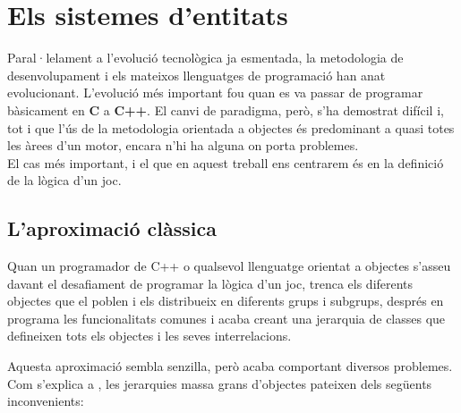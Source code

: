 \section{Els sistemes d'entitats}

Paral·lelament a l'evolució tecnològica ja esmentada, la metodologia de desenvolupament i els mateixos llenguatges de programació han anat evolucionant. L'evolució més important fou quan es va passar de programar bàsicament en {\bf C} a {\bf C++}. El canvi de paradigma, però, s'ha demostrat difícil i, tot i que l'ús de la metodologia orientada a objectes és predominant a quasi totes les àrees d'un motor, encara n'hi ha alguna on porta problemes.
\\

El cas més important, i el que en aquest treball ens centrarem és en la definició de la lògica d'un joc.

\subsection{L'aproximació clàssica}

Quan un programador de {C++} o qualsevol llenguatge orientat a objectes s'asseu davant el desafiament de programar la lògica d'un joc, trenca els diferents objectes que el poblen i els distribueix en diferents grups i subgrups, després en programa les funcionalitats comunes i acaba creant una jerarquia de classes que defineixen tots els objectes i les seves interrelacions. 

Aquesta aproximació sembla senzilla, però acaba comportant diversos problemes. Com s'explica a \citep[p.~719]{Gregory09}, les jerarquies massa grans d'objectes pateixen dels següents inconvenients:


